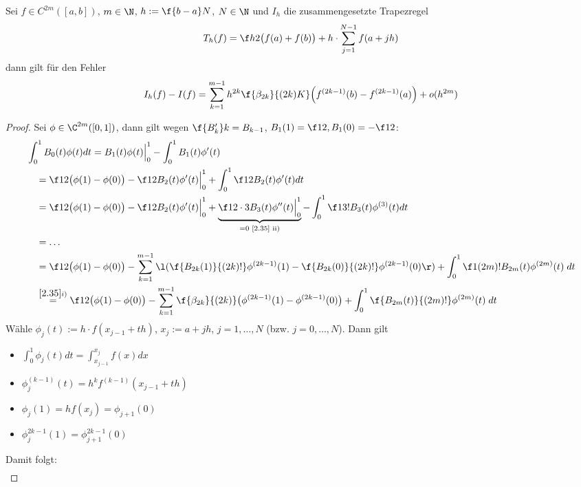 \documentclass[11pt]{scrbook}
\begin{document}
\begin{st}
	Sei $f\in C^{2m}([a,b])$, $m\in \N$, $h:= \f {b-a}N$, $N\in \N$ und $I_h$ die zusammengesetzte Trapezregel
	\[
		T_h(f) = \f h2 \big(f(a) + f(b)\big) + h \cdot \sum_{j=1}^{N-1} f(a+jh)
	\]
	dann gilt für den Fehler
	\[
		I_h(f) - I(f) = \sum_{k=1}^{m-1} h^{2k} \f{\beta_{2k}}{(2k)K} \Big( f^{(2k-1)}(b) - f^{(2k-1)}(a) \Big) + o(h^{2m})
	\]
	\begin{proof}
		Sei $\phi \in \C^{2m}([0,1])$, dann gilt wegen $\f{B_k'}k = B_{k-1}$, $B_1(1) = \f 12, B_1(0) = - \f 12$:
		\begin{align*}
			&\int_0^1 B_0(t) \phi(t) dt 
			= B_1(t) \phi(t) \Big|_{0}^1 - \int_0^1 B_1(t) \phi'(t) \\
			&\quad= \f 12 \big( \phi(1) - \phi(0) \big) - \f 12 B_2(t) \phi'(t) \Big|_0^1 + \int_0^1 \f 12 B_2(t) \phi'(t) dt \\
			&\quad= \f 12 \big( \phi(1) - \phi(0) \big) - \f 12 B_2(t) \phi'(t) \Big|_0^1 + \underbrace{\f 1{2\cdot 3} B_3(t) \phi''(t) \Big|_0^1}_{=0 \text{ \ref{2.35} ii)}} - \int_0^1 \f 1{3!} B_3(t) \phi^{(3)}(t) dt \\
			&\quad= \dotsc \\
			&\quad= \f 12 \big( \phi(1) - \phi(0) \big) - \sum_{k=1}^{m-1} \l( \f {B_{2k}(1)}{(2k)!} \phi^{(2k-1)}(1) - \f {B_{2k}(0)}{(2k)!} \phi^{(2k-1)}(0) \r) + \int_0^1 \f 1{(2m)!} B_{2m}(t) \phi^{(2m)}(t) \; dt \\
			&\quad\stackrel{\ref{2.35} i)}=  \f 12 \big(\phi(1) - \phi(0)\big) - \sum_{k=1}^{m-1} \f {\beta_{2k}}{(2k)} \big( \phi^{(2k-1)}(1) - \phi^{(2k-1)}(0) \big) + \int_0^1 \f {B_{2m}(t)}{(2m)!} \phi^{(2m)}(t) \; dt
		\end{align*}
		Wähle  $\phi_j(t) := h \cdot f(x_{j-1} + th)$, $x_j := a+jh$, $j=1,\dotsc, N$ (bzw. $j=0,\dotsc, N$).
		Dann gilt
		\begin{itemize}
			\item
				$\displaystyle
				\int_0^1 \phi_j(t) dt = \int_{x_{j-1}}^{x_j} f(x) dx
				$
			\item
				$\displaystyle
				\phi_j^{(k-1)}(t) = h^k f^{(k-1)}(x_{j-1} + th)
				$
			\item
				$\displaystyle
				\phi_j(1) = h f(x_j) = \phi_{j+1}(0)
				$
			\item
				$\displaystyle
				\phi_j^{2k-1}(1) = \phi_{j+1}^{2k-1}(0)
				$
		\end{itemize}
		Damit folgt:
		\begin{align*}

\end{align*}
\end{proof}
\end{st}
\end{document}
